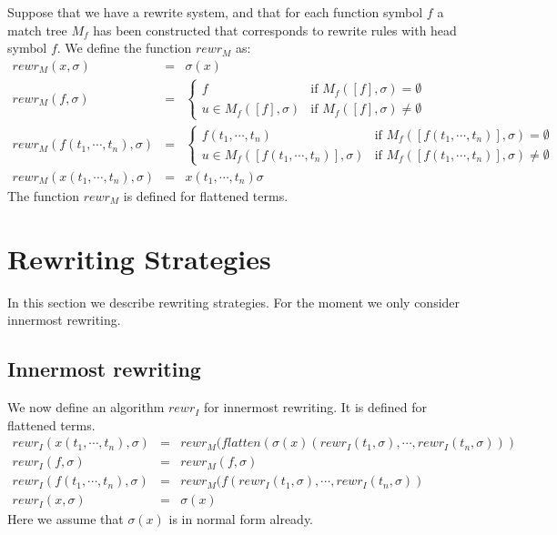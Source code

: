 \documentclass{article}
\begin{document}
Suppose that we have a rewrite system, and that for each function symbol $f$
a match tree $M_{f}$ has been constructed that corresponds to rewrite rules
with head symbol $f$. We define the function $rewr_{M}$ as:%
\begin{equation*}
\begin{array}{lll}
rewr_{M}(x,\sigma ) & = & \sigma (x) \\ 
rewr_{M}(f,\sigma ) & = & \left\{ 
\begin{array}{ll}
f & \text{if }M_{f}([f],\sigma )=\emptyset  \\ 
u\in M_{f}([f],\sigma ) & \text{if }M_{f}([f],\sigma )\neq \emptyset 
\end{array}%
\right.  \\ 
rewr_{M}(f(t_{1},\cdots ,t_{n}),\sigma ) & = & \left\{ 
\begin{array}{ll}
f(t_{1},\cdots ,t_{n}) & \text{if }M_{f}([f(t_{1},\cdots ,t_{n})],\sigma
)=\emptyset  \\ 
u\in M_{f}([f(t_{1},\cdots ,t_{n})],\sigma ) & \text{if }M_{f}([f(t_{1},%
\cdots ,t_{n})],\sigma )\neq \emptyset 
\end{array}%
\right.  \\ 
rewr_{M}(x(t_{1},\cdots ,t_{n}),\sigma ) & = & x(t_{1},\cdots ,t_{n})\sigma 
\end{array}%
\end{equation*}%
The function $rewr_{M}$ is defined for flattened terms.

\section{Rewriting Strategies}

In this section we describe rewriting strategies. For the moment we only
consider innermost rewriting.

\subsection{Innermost rewriting}

We now define an algorithm $rewr_{I}$ for innermost rewriting. It is defined
for flattened terms.%
\begin{equation*}
\begin{array}{lll}
rewr_{I}(x(t_{1},\cdots ,t_{n}),\sigma ) & = & rewr_{M}(flatten(\sigma
(x)(rewr_{I}(t_{1},\sigma ),\cdots ,rewr_{I}(t_{n},\sigma ))) \\ 
rewr_{I}(f,\sigma ) & = & rewr_{M}(f,\sigma ) \\ 
rewr_{I}(f(t_{1},\cdots ,t_{n}),\sigma ) & = & rewr_{M}(f(rewr_{I}(t_{1},%
\sigma ),\cdots ,rewr_{I}(t_{n},\sigma )) \\ 
rewr_{I}(x,\sigma ) & = & \sigma (x)%
\end{array}%
\end{equation*}%
Here we assume that $\sigma (x)$ is in normal form already.
\end{document}
